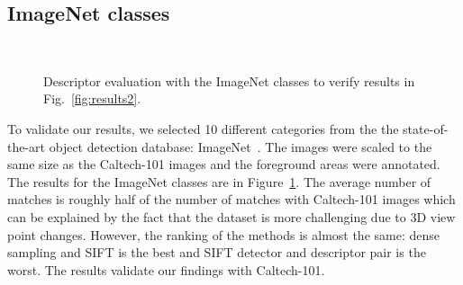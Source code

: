 \documentclass[review]{elsarticle}
\begin{document}
\subsection{ImageNet classes}
%
%
\begin{figure}[h]
\begin{center}
\\
\caption{Descriptor evaluation with the ImageNet classes to
verify results in Fig.~\ref{fig:results2}.\label{fig:results2_imagenet}}
\end{center}
\end{figure}
%
To validate our results, we selected 10 different categories from the
the state-of-the-art object detection database: ImageNet~\cite{imagenet}.
The images were scaled to the same size as the Caltech-101 images and
the foreground areas were annotated. The results for the ImageNet classes
are in Figure~\ref{fig:results2_imagenet}. The average number of matches
is roughly half of the number of matches with Caltech-101 images which
can be explained by the fact that the dataset is more challenging
due to 3D view point changes. However, the ranking of
the methods is almost the same: dense sampling and
SIFT is the best and SIFT detector and descriptor pair is the
worst. The results validate our findings with Caltech-101.
\end{document}
